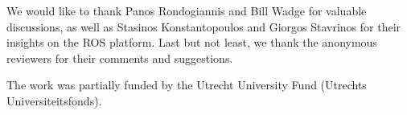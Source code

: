 \documentclass[sigplan,screen,10pt]{acmart}
\begin{document}
\begin{acks}
We would like to thank Panos Rondogiannis and Bill Wadge for valuable discussions,
as well as Stasinos Konstantopoulos and Giorgos Stavrinos for their insights on the ROS platform.
Last but not least, we thank the anonymous reviewers for their comments and suggestions.

The work was partially funded by the Utrecht University Fund (Utrechts Universiteitsfonds).
\end{acks}



\end{document}
